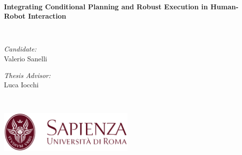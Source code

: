 \begin{titlepage}
\begin{center}




\HRule \\[0.2cm]
{\Large \bfseries Integrating Conditional Planning and Robust Execution in Human-Robot Interaction \\[0.2cm] }

\HRule \\[0.5cm]

\noindent
\begin{minipage}[t]{0.4\textwidth}
\begin{flushleft} \large
\emph{Candidate:}\\
Valerio Sanelli\\
\end{flushleft}
\end{minipage}%
\begin{minipage}[t]{0.4\textwidth}
\begin{flushright} \large
\emph{Thesis Advisor:} \\
Luca Iocchi
\end{flushright}
\end{minipage}
\\[2cm]

\end{center}
\vfill
\begin{flushleft}
\includegraphics[width=0.5\textwidth]{images/logo.png}
\end{flushleft}


\end{titlepage}